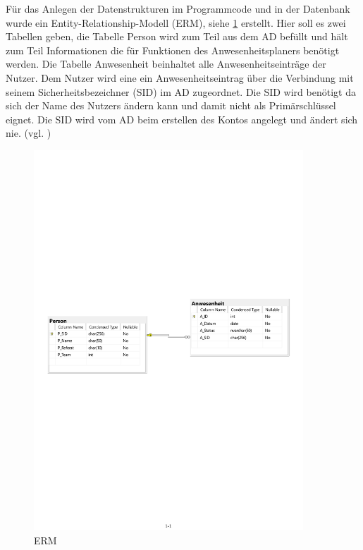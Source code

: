 Für das Anlegen der Datenstrukturen im Programmcode und in der Datenbank wurde ein Entity-Relationship-Modell (ERM), siehe \ref{abb:ERM} erstellt. Hier soll es zwei Tabellen geben, die Tabelle Person wird zum Teil aus dem AD befüllt und hält zum Teil Informationen die für Funktionen des Anwesenheitsplaners benötigt werden. Die Tabelle Anwesenheit beinhaltet alle Anwesenheitseinträge der Nutzer. Dem Nutzer wird eine ein Anwesenheitseintrag über die Verbindung mit seinem Sicherheitsbezeichner (SID) im AD zugeordnet. Die SID wird benötigt da sich der Name des Nutzers ändern kann und damit nicht als Primärschlüssel eignet. Die SID wird vom AD beim erstellen des Kontos angelegt und ändert sich nie. (vgl. \cite{sid})

\begin{figure}[htbp]
    \centering
    \includegraphics[width=0.9\textwidth,angle=0]{abb/ERM.pdf}
    \caption[Beschreibung]{ERM}
    \label{abb:ERM}
\end{figure}

